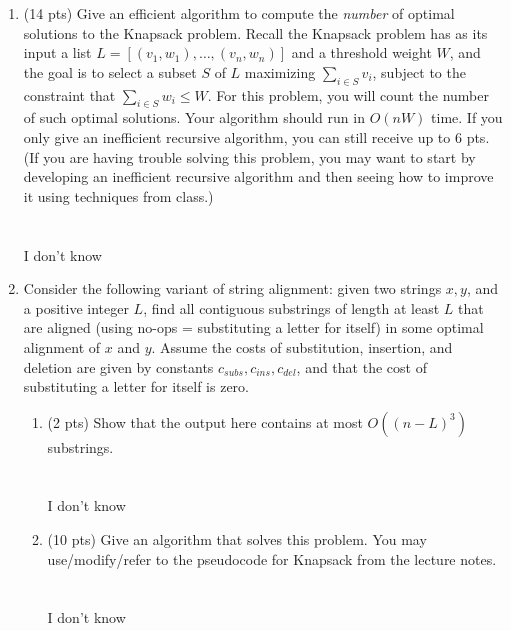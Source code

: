 \documentclass[12pt]{article}
\begin{document}
\begin{enumerate}
\begin{enumerate}
\end{enumerate}

\item (14 pts) Give an efficient algorithm to compute the \emph{number} of optimal solutions to the Knapsack problem. Recall the Knapsack problem has as its input a list $L=[(v_1, w_1), \dotsc, (v_n, w_n)]$ and a threshold weight $W$, and the goal is  to select a subset $S$ of $L$ maximizing $\sum_{i \in S} v_i$, subject to the constraint that $\sum_{i \in S} w_i \leq W$. For this problem, you will count the number of such optimal solutions. Your algorithm should run in $O(nW)$ time. If you only give an inefficient recursive algorithm, you can still receive up to 6 pts. (If you are having trouble solving this problem, you may want to start by developing an inefficient recursive algorithm and then seeing how to improve it using techniques from class.) 
\\ \\ \\ I don't know
\pagebreak

\item Consider the following variant of string alignment: given two strings $x,y$, and a positive integer $L$, find all contiguous substrings of length at least $L$ that are aligned (using no-ops = substituting a letter for itself) in some optimal alignment of $x$ and $y$. Assume the costs of substitution, insertion, and deletion are given by constants $c_{subs}, c_{ins}, c_{del}$, and that the cost of substituting a letter for itself is zero.

\begin{enumerate}
\item (2 pts) Show that the output here contains at most $O((n-L)^3)$ substrings.
\\ \\ \\ I don't know
\pagebreak

\item (10 pts) Give an algorithm that solves this problem. You may use/modify/refer to the pseudocode for Knapsack from the lecture notes.
\\ \\ \\ I don't know
\pagebreak
		
\end{enumerate}



	

\end{enumerate}
\end{document}
